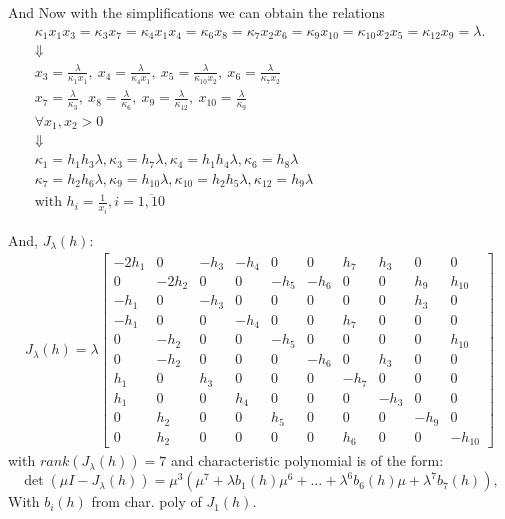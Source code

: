 \documentclass[aspectratio=169]{beamer}
\begin{document}
\begin{frame}
And Now with the simplifications we can obtain the relations
\begin{gather*}
	\kappa_1x_1x_3=\kappa_3x_7=\kappa_4x_1x_4=\kappa_6x_8=\kappa_7x_2x_6=\kappa_9x_{10}=\kappa_{10}x_2x_5=\kappa_{12}x_9=\lambda. \\
	\Downarrow \\
	x_{3} = \frac{\lambda}{\kappa_{1} x_{1}}, \ x_{4} = \frac{\lambda}{\kappa_{4} x_{1}}, \ x_{5} = \frac{\lambda}{\kappa_{10} x_{2}}, \ x_{6} = \frac{\lambda}{\kappa_{7} x_{2}} \\
	x_{7} = \frac{\lambda}{\kappa_{3}}, \ x_{8} = \frac{\lambda}{\kappa_{6}}, \ x_{9} = \frac{\lambda}{\kappa_{12}}, \ x_{10} = \frac{\lambda}{\kappa_{9}} \\
	\forall x_1, x_2 > 0 \\
	\Downarrow \\
	\kappa_{1} = h_{1} h_{3} \lambda, \kappa_{3} = h_{7} \lambda, \kappa_{4} = h_{1} h_{4} \lambda, \kappa_{6} = h_{8} \lambda \\
	\kappa_{7} = h_{2} h_{6} \lambda, \kappa_{9} = h_{10} \lambda, \kappa_{10} = h_{2} h_{5} \lambda, \kappa_{12} = h_{9} \lambda \\
	\text{with } h_i = \frac{1}{x_i} , i = \overline{1,10}
\end{gather*}
\end{frame}

\begin{frame}
And, $J_\lambda(h)$:
\begin{align}
	J_\lambda(h) = \lambda
	\left.\left[
		\begin{array}{rrrrrrrrrr}-2h_{1}&0&-h_{3}&-h_{4}&0&0&h_{7}&h_{3}&0&0\\0&-2h_{2}&0&0&-h_{5}&-h_{6}&0&0&h_{9}&h_{10}\\-h_{1}&0&-h_{3}&0&0&0&0&0&h_{3}&0\\-h_{1}&0&0&-h_{4}&0&0&h_{7}&0&0&0\\0&-h_{2}&0&0&-h_{5}&0&0&0&0&h_{10}\\0&-h_{2}&0&0&0&-h_{6}&0&h_{3}&0&0\\h_{1}&0&h_{3}&0&0&0&-h_{7}&0&0&0\\h_{1}&0&0&h_{4}&0&0&0&-h_{3}&0&0\\0&h_{2}&0&0&h_{5}&0&0&0&-h_{9}&0\\0&h_{2}&0&0&0&0&h_{6}&0&0&-h_{10}
	\end{array}\right.\right]
\end{align}
with $rank(J_\lambda(h)) = 7$ and characteristic polynomial is of the form:
\[
	\det\left(\mu I-J_\lambda(h)\right)=\mu^3\left(\mu^7+\lambda b_1(h)\mu^6+\ldots+\lambda^6b_6(h)\mu+\lambda^7b_7(h)\right),
\]
With $b_i(h)$ from char. poly of $J_1(h)$.
\end{frame}
\end{document}

